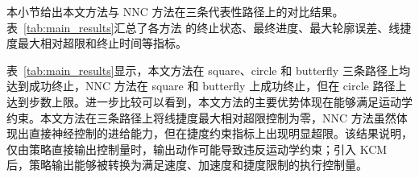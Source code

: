 \documentclass[preprint,12pt]{elsarticle}
\begin{document}
本小节给出本文方法与 NNC 方法在三条代表性路径上的对比结果。表~\ref{tab:main_results}汇总了各方法 的终止状态、最终进度、最大轮廓误差、线捷度最大相对超限和终止时间等指标。


表~\ref{tab:main_results}显示，本文方法在 square、circle 和 butterfly 三条路径上均达到成功终止，NNC 方法在 square 和 butterfly 上成功终止，但在 circle 路径上达到步数上限。进一步比较可以看到，本文方法的主要优势体现在能够满足运动学约束。本文方法在三条路径上将线捷度最大相对超限控制为零，NNC 方法虽然体现出直接神经控制的进给能力，但在捷度约束指标上出现明显超限。该结果说明，仅由策略直接输出控制量时，输出动作可能导致违反运动学约束；引入 KCM 后，策略输出能够被转换为满足速度、加速度和捷度限制的执行控制量。
\end{document}
